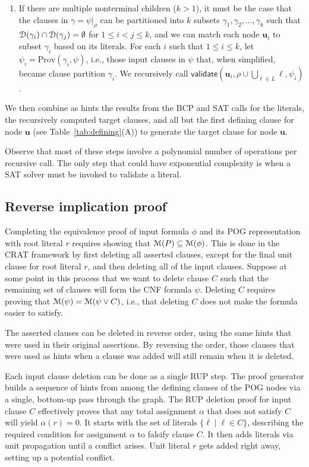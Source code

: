 \documentclass[letterpaper,USenglish,cleveref, autoref, thm-restate]{lipics-v2021}
\newcommand{\obar}[1]{\overline{#1}}
\newcommand{\lit}{\ell}
\newcommand{\dependencyset}{{\cal D}}
\newcommand{\assign}{\alpha}
\newcommand{\passign}{\rho}
\newcommand{\modelset}{{\cal M}}
\newcommand{\validate}{\textsf{validate}}
\newcommand{\prov}{\textrm{Prov}}
\newcommand{\makenode}[1]{\mathbf{#1}}
\newcommand{\nodeu}{\makenode{u}}
\newcommand{\simplify}[2]{#1|_{#2}}
\begin{document}
\begin{enumerate}
\begin{enumerate}
\item If there are multiple nonterminal children ($k > 1$),
  it must be the case that the clauses in
  $\gamma = \simplify{\psi}{\passign}$ can be partitioned into $k$ subsets
  $\gamma_1, \gamma_2, \ldots, \gamma_k$ such that $\dependencyset(\gamma_i)
  \cap \dependencyset(\gamma_j) = \emptyset$ for $1 \leq i < j \leq k$,
  and we can match each node $\nodeu_i$ to subset $\gamma_i$ based on its
  literals.
  For each $i$ such that $1 \leq i \leq k$, let $\psi_i = \prov(\gamma_i, \psi)$, i.e., those input clauses in $\psi$ that, when simplified, became clause partition $\gamma_i$.
  We recursively call
  $\validate \left(\nodeu_i, \passign \cup \bigcup_{\lit \in L} \lit, \psi_i\right)$.
\end{enumerate}
  We then combine as hints the results from the BCP and SAT calls for
  the literals, the recursively computed target clauses, and all but
  the first defining clause for node $\nodeu$
(see Table~\ref{tab:defining}(A))
to generate the target clause for node $\nodeu$.
\end{enumerate}
Observe that most of these steps involve a polynomial number of
operations per recursive call.  The only step that could have
exponential complexity is when a SAT solver must be invoked to validate a
literal.

\subsection{Reverse implication proof}

Completing the equivalence proof of input formula $\phi$ and its POG
representation with root literal $r$ requires showing that
$\modelset(P) \subseteq \modelset(\phi)$.  This is done in the
CRAT framework by first deleting all asserted clauses, except for the
final unit clause for root literal $r$, and then deleting all of the
input clauses.  Suppose at some point in this process that we want to
delete clause $C$ such that the remaining set of clauses will form the
CNF formula $\psi$.  Deleting $C$ requires proving that
$\modelset(\psi) = \modelset(\psi \lor C)$, i.e., that deleting $C$
does not make the formula easier to satisfy.

The asserted clauses can be deleted in reverse order, using the same
hints that were used in their original assertions.  By reversing the
order, those clauses that were used as hints when a clause was
added will still remain when it is deleted.

Each input clause deletion can be done as a single RUP step.  The
proof generator builds a sequence of hints from among the defining
clauses of the POG nodes via a single, bottom-up pass through the
graph.  The RUP deletion proof for input clause $C$ effectively proves that any
total assignment $\assign$ that does not satisfy $C$ will yield
$\assign(r) = 0$.  It starts with the set of literals
$\{ \obar{\lit} \mid \lit \in C\}$, describing the required condition for
assignment $\assign$ to falsify clause $C$.
It then
adds literals via unit propagation until a
conflict arises.    Unit literal $r$ gets
added right away, setting up a potential conflict.
\end{document}
